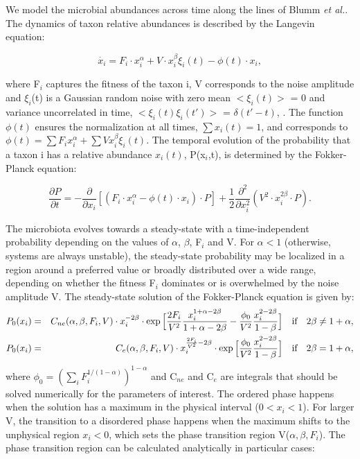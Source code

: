 We model the microbial abundances across time along the lines of Blumm \textit{et al.}\cite{ranking}. The dynamics of taxon relative abundances is described by the Langevin equation:
\begin{linenomath}
\begin{equation}
\dot{x_i} = F_i \cdot x_i^\alpha + V \cdot x_i^\beta \xi_i(t) - \phi(t) \cdot x_i,
\end{equation}
\end{linenomath}
where F$_i$ captures the fitness of the taxon i, V corresponds to the noise amplitude and $\xi_i$(t) is a Gaussian random noise with zero mean  $<\xi_i(t)>$ = 0 and variance uncorrelated in time, $<\xi_i(t) \xi_i(t')>$ =  $\delta(t'-t)$, . The function $\phi(t)$ ensures the normalization at all times, $\sum x_i(t) = 1$, and corresponds to $\phi(t) = \sum F_i x_i^\alpha + \sum V x_i^\beta \xi_i(t)$.
The temporal evolution of the probability that a taxon i has a relative abundance $x_i(t)$, P(x$_i$,t), is determined by the Fokker-Planck equation:
\begin{linenomath}
\begin{equation}
\frac{\partial P}{\partial t} = - \frac{\partial}{\partial x_i}  [(F_i \cdot x_i^\alpha - \phi(t) \cdot x_i ) \cdot P]+ \frac{1}{2} \frac{\partial^2}{\partial x_i^2} (V^2 \cdot x_i^{2\beta}\cdot P).
\end{equation}
\end{linenomath}
The microbiota evolves towards a steady-state with a time-independent probability depending on the values of $\alpha$, $\beta$, F$_i$ and V. For $\alpha<1$ (otherwise, systems are always unstable), the steady-state probability may be localized in a region around a preferred value or broadly distributed over a wide range, depending on whether the fitness F$_i$  dominates or is overwhelmed by the noise amplitude V. The steady-state solution of the Fokker-Planck equation is given by:
\begin{eqnarray}
P_0 (x_i) &=& C_{ne}(\alpha,\beta,F_i,V)  \cdot x_i^{-2\beta}  \cdot \exp\Big[\frac{2F_i}{V^2}\frac{x_i^{1+\alpha-2\beta}}{1+\alpha-2\beta}-\frac{\phi_0}{V^2}\frac{x_i^{2-2\beta}}{1-\beta}\Big] \quad \textrm{if} \quad  2\beta \ne 1+\alpha, \notag \\
P_0 (x_i) &=& C_e(\alpha,\beta,F_i,V)  \cdot x_i^{\frac{2F_i}{V^2} -2\beta}  \cdot \exp\Big[\frac{\phi_0}{V^2}\frac{x_i^{2-2\beta}}{1-\beta}\Big] \quad \textrm{if} \quad  2\beta = 1+\alpha,
\notag
\end{eqnarray}
where $\phi_0 = (\sum_i F_i^{1/(1-\alpha)})^{1-\alpha}$ and C$_{ne}$ and C$_{e}$ are integrals that should be solved numerically for the parameters of interest. The ordered phase happens when the solution has a maximum in the physical interval ($0<x_i<1$). For larger V, the transition to a disordered phase happens when the maximum shifts to the unphysical region $x_i<0$, which sets the phase transition region V($\alpha,\beta,F_i$). The phase transition region can be calculated analytically in particular cases:
